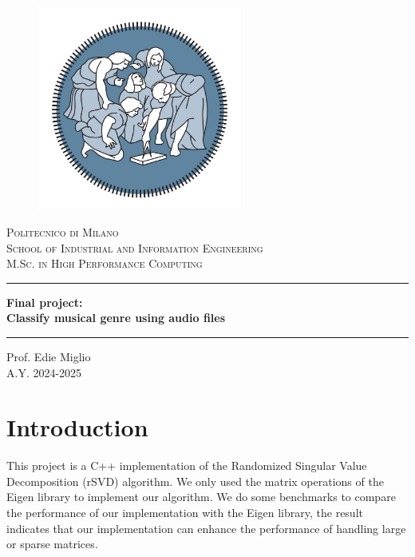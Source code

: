 \documentclass[11.5pt]{article}
\begin{document}
\begin{titlingpage}
    \begin{center}
        \begin{figure}
            \centering
            \includegraphics[width=0.6\textwidth]{graphics/logopolimi_mod.jpg}
        \end{figure}
        \Large{\textsc{Politecnico di Milano \\ School of Industrial and Information Engineering \\ M.Sc. in High Performance Computing}}

        \vspace{1cm}

        \rule{0.95\textwidth}{0.7mm}
        {\Large{\textbf{Final project: \\Classify musical genre using audio files}}}
        \rule{0.95\textwidth}{0.7mm}

        \vspace{1cm}

        \large{Prof. Edie Miglio \\ A.Y. 2024-2025}
    \end{center}

\end{titlingpage}


\tableofcontents

\clearpage

\setcounter{page}{1}

\section{Introduction} \label{sec:introduction}
This project is a C++ implementation of the Randomized Singular Value Decomposition (rSVD) algorithm. We only used the matrix operations of the Eigen library to implement our algorithm. We do some benchmarks to compare the performance of our implementation with the Eigen library, the result indicates that our implementation can enhance the performance of handling large or sparse matrices.


\clearpage

\end{document}
